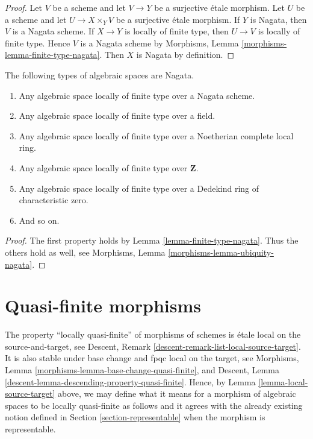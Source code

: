 \begin{proof}
Let $V$ be a scheme and let $V \to Y$ be a surjective \'etale morphism.
Let $U$ be a scheme and let $U \to X \times_Y V$ be a surjective \'etale
morphism. If $Y$ is Nagata, then $V$ is a Nagata scheme.
If $X \to Y$ is locally of finite type, then $U \to V$ is locally
of finite type. Hence $V$ is a Nagata scheme by
Morphisms, Lemma \ref{morphisms-lemma-finite-type-nagata}.
Then $X$ is Nagata by definition.
\end{proof}

\begin{lemma}
\label{lemma-ubiquity-nagata}
The following types of algebraic spaces are Nagata.
\begin{enumerate}
\item Any algebraic space locally of finite type over a Nagata scheme.
\item Any algebraic space locally of finite type over a field.
\item Any algebraic space locally of finite type over a
Noetherian complete local ring.
\item Any algebraic space locally of finite type over $\mathbf{Z}$.
\item Any algebraic space locally of finite type over a Dedekind ring of
characteristic zero.
\item And so on.
\end{enumerate}
\end{lemma}

\begin{proof}
The first property holds by Lemma \ref{lemma-finite-type-nagata}.
Thus the others hold as well, see
Morphisms, Lemma \ref{morphisms-lemma-ubiquity-nagata}.
\end{proof}








\section{Quasi-finite morphisms}
\label{section-quasi-finite}

\noindent
The property ``locally quasi-finite'' of morphisms of schemes is
\'etale local on the source-and-target, see
Descent, Remark \ref{descent-remark-list-local-source-target}.
It is also stable under base change and fpqc local on the target, see
Morphisms, Lemma \ref{morphisms-lemma-base-change-quasi-finite}, and
Descent, Lemma \ref{descent-lemma-descending-property-quasi-finite}.
Hence, by
Lemma \ref{lemma-local-source-target}
above, we may define what it means for a morphism of algebraic spaces
to be locally quasi-finite as
follows and it agrees with the already existing notion defined in
Section \ref{section-representable}
when the morphism is representable.

